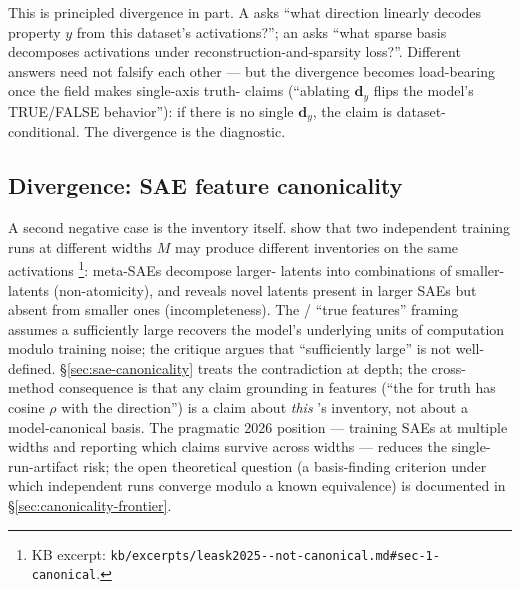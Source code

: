 This is principled divergence in part. A  asks ``what
direction linearly decodes property $y$ from this dataset's
activations?''; an  asks ``what sparse basis decomposes
activations under reconstruction-and-sparsity loss?''. Different
answers need not falsify each other --- but the divergence becomes
load-bearing once the field makes single-axis truth- claims
(``ablating $\mathbf{d}_y$ flips the model's TRUE/FALSE behavior''):
if there is no single $\mathbf{d}_y$, the claim is
dataset-conditional. The divergence is the diagnostic.

\subsection{Divergence: SAE feature canonicality}
\label{sec:cross-sae}

A second negative case is the   inventory itself.
\citet{leask2025-sae-not-canonical} show that two independent 
training runs at different widths $M$ may produce different
 inventories on the same activations
\citep[\S 1]{leask2025-sae-not-canonical}\footnote{KB excerpt:
\texttt{kb/excerpts/leask2025--not-canonical.md\#sec-1-canonical}.}:
meta-SAEs decompose larger- latents into combinations of
smaller- latents (non-atomicity), and  reveals
novel latents present in larger SAEs but absent from smaller ones
(incompleteness). The
\citet{bricken2023-monosemanticity}/\citet{templeton2024-scaling-monosemanticity}
``true features'' framing assumes a sufficiently large 
recovers the model's underlying units of computation modulo
training noise; the \citeauthor{leask2025-sae-not-canonical}
critique argues that ``sufficiently large'' is not well-defined.
\S\ref{sec:sae-canonicality} treats the contradiction at depth;
the cross-method consequence is that any claim grounding in 
features (``the   for truth has cosine $\rho$ with the
 direction'') is a claim about \emph{this} 's inventory,
not about a model-canonical basis. The pragmatic 2026 position ---
training SAEs at multiple widths and reporting which claims survive
across widths --- reduces the single-run-artifact risk; the open
theoretical question (a basis-finding criterion under which
independent runs converge modulo a known equivalence) is
documented in \S\ref{sec:canonicality-frontier}.

